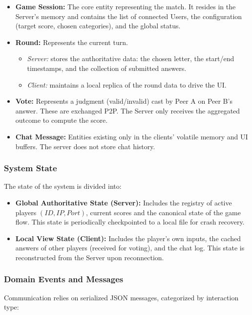 \documentclass{scrartcl}
\begin{document}
\begin{itemize}
    \item \textbf{Game Session:} 
    The core entity representing the match.
    It resides in the Server's memory and contains the list of connected Users,
    the configuration (target score, chosen categories), and the global status.
    
    \item \textbf{Round:} 
    Represents the current turn.
    \begin{itemize}
        \item \textit{Server:} stores the authoritative data: the chosen letter, the start/end timestamps, and the collection of submitted answers.
        \item \textit{Client:} maintains a local replica of the round data to drive the UI.
    \end{itemize}

    \item \textbf{Vote:} 
    Represents a judgment (valid/invalid) cast by Peer A on Peer B's answer. 
    These are exchanged P2P. 
    The Server only receives the aggregated outcome to compute the score.

    \item \textbf{Chat Message:}
    Entities existing only in the clients' volatile memory and UI buffers. 
    The server does not store chat history.

\end{itemize}

\subsubsection*{System State}
The state of the system is divided into:
\begin{itemize}
    \item \textbf{Global Authoritative State (Server):} 
    Includes the registry of active players $(ID, IP, Port)$, current scores
    and the canonical state of the game flow. 
    This state is periodically checkpointed to a local file for crash recovery.
    
    \item \textbf{Local View State (Client):} 
    Includes the player's own inputs, the cached answers of other players (received for voting), and the chat log. 
    This state is reconstructed from the Server upon reconnection.
\end{itemize}

\subsubsection*{Domain Events and Messages}
Communication relies on serialized JSON messages, categorized by interaction type:
\end{document}

